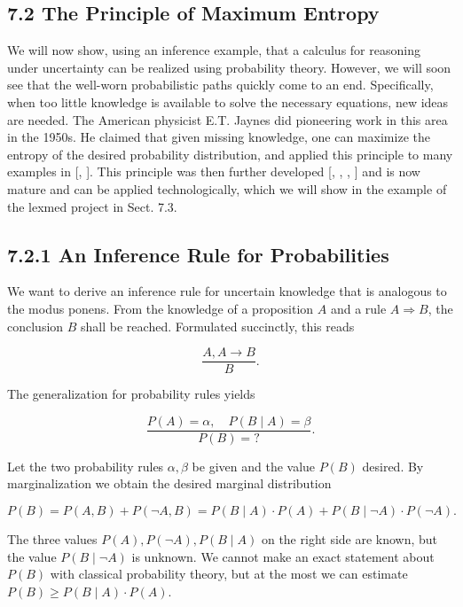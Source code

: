 \documentclass[10pt]{article}
\begin{document}
\subsection*{7.2 The Principle of Maximum Entropy}
We will now show, using an inference example, that a calculus for reasoning under uncertainty can be realized using probability theory. However, we will soon see that the well-worn probabilistic paths quickly come to an end. Specifically, when too little knowledge is available to solve the necessary equations, new ideas are needed. The American physicist E.T. Jaynes did pioneering work in this area in the 1950s. He claimed that given missing knowledge, one can maximize the entropy of the desired probability distribution, and applied this principle to many examples in [\cite{jaynes1957information}, \cite{jaynes2003probability}]. This principle was then further developed [\cite{cheeseman1983method}, \cite{nilsson1986probabilistic}, \cite{kane1989maximum}, \cite{kapur1992entropy}] and is now mature and can be applied technologically, which we will show in the example of the lexmed project in Sect. 7.3.

\subsection*{7.2.1 An Inference Rule for Probabilities}
We want to derive an inference rule for uncertain knowledge that is analogous to the modus ponens. From the knowledge of a proposition $A$ and a rule $A \Rightarrow B$, the conclusion $B$ shall be reached. Formulated succinctly, this reads

$$
\frac{A, A \rightarrow B}{B} .
$$

The generalization for probability rules yields


$$
\frac{P(A)=\alpha, \quad P(B \mid A)=\beta}{P(B)=?} .
$$

Let the two probability rules $\alpha, \beta$ be given and the value $P(B)$ desired. By marginalization we obtain the desired marginal distribution

$$
P(B)=P(A, B)+P(\neg A, B)=P(B \mid A) \cdot P(A)+P(B \mid \neg A) \cdot P(\neg A) .
$$

The three values $P(A), P(\neg A), P(B \mid A)$ on the right side are known, but the value $P(B \mid \neg A)$ is unknown. We cannot make an exact statement about $P(B)$ with classical probability theory, but at the most we can estimate $P(B) \geq P(B \mid A) \cdot P(A)$.
\end{document}
